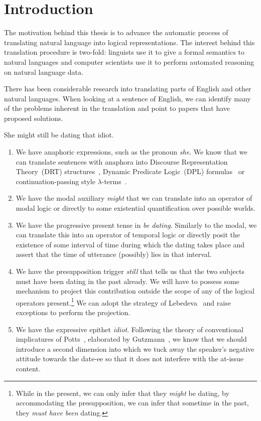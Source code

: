 \chapter*{Introduction}

The motivation behind this thesis is to advance the automatic process of
translating natural language into logical representations. The interest
behind this translation procedure is two-fold: linguists use it to give a
formal semantics to natural languages and computer scientists use it to
perform automated reasoning on natural language data.

There has been considerable research into translating parts of English and
other natural languages. When looking at a sentence of English, we can
identify many of the problems inherent in the translation and point to
papers that have proposed solutions.

\begin{exe}
  \ex She might still be dating that idiot. \label{ex:intro}
\end{exe}

\begin{enumerate}
\item \label{item:first-feature} We have anaphoric expressions, such as the
  pronoun \emph{she}. We know that we can translate sentences with anaphora into
  Discourse Representation Theory~(DRT) structures~\cite{kamp1993discourse},
  Dynamic Predicate Logic~(DPL) formulas~\cite{groenendijk1991dynamic} or
  continuation-passing style $\lambda$-terms~\cite{de2006towards}.
  \item We have the modal auxiliary \emph{might} that we can translate into
    an operator of modal logic or directly to some existential
    quantification over possible worlds.
  \item We have the progressive present tense in \emph{be
      dating}. Similarly to the modal, we can translate this into an
    operator of temporal logic or directly posit the existence of some
    interval of time during which the dating takes place and assert that
    the time of utterance (possibly) lies in that interval.
  \item We have the presupposition trigger \emph{still} that tells us that
    the two subjects must have been dating in the past already. We will
    have to possess some mechanism to project this contribution outside the
    scope of any of the logical operators present.\footnote{While in the
      present, we can only infer that they \emph{might} be dating, by
      accommodating the presupposition, we can infer that sometime in the
      past, they \emph{must have been} dating.} We can adopt the strategy
    of Lebedeva~\cite{lebedeva2012expression} and raise exceptions to
    perform the projection.
  \item \label{item:last-feature} We have the expressive epithet
    \emph{idiot}. Following the theory of conventional implicatures of
    Potts~\cite{potts2005logic}, elaborated by
    Gutzmann~\cite{gutzmann2015use}, we know that we should introduce a
    second dimension into which we tuck away the speaker's negative
    attitude towards the date-ee so that it does not interfere with the
    at-issue content.
\end{enumerate}

